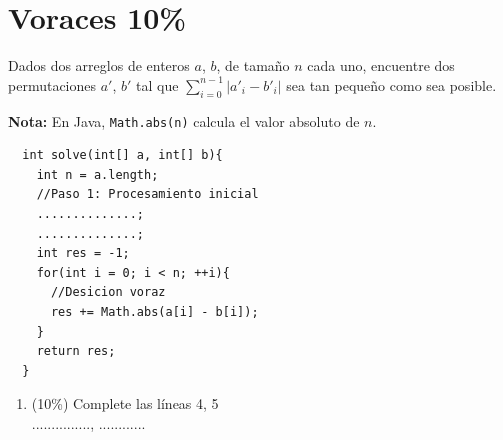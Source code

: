\documentclass[twocolumn]{article}
\begin{document}
  \section{Voraces 10\%}
  Dados dos arreglos de enteros $a$, $b$, de tamaño $n$ cada uno, encuentre dos permutaciones $a'$, $b'$ tal que $\sum\limits_{i = 0}^{n - 1}{|a'_i - b'_i|}$ sea tan pequeño como sea posible.

{\footnotesize
  \textbf{Nota: } En Java, \texttt{Math.abs(n)} calcula el valor absoluto de $n$.
  \begin{lstlisting}
  int solve(int[] a, int[] b){
    int n = a.length;
    //Paso 1: Procesamiento inicial
    ..............;
    ..............;
    int res = -1;
    for(int i = 0; i < n; ++i){
      //Desicion voraz
      res += Math.abs(a[i] - b[i]);
    }
    return res;
  }
  \end{lstlisting}
  }

  \begin{enumerate}[label=\alph*]
    \item (10\%) Complete las líneas 4, 5\\

     ..............., ............

  \end{enumerate}
\end{document}
